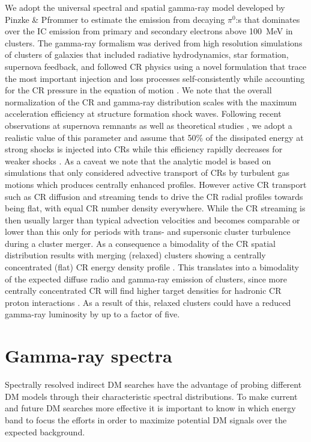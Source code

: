 \documentclass[10pt,aps,pra,reprint,amsmath,amsfonts,amssymb,showpacs,nofootinbib,floatfix]{revtex4-1}
\begin{document}
We adopt the universal spectral and spatial gamma-ray model developed
by Pinzke \& Pfrommer \cite{2010MNRAS.409..449P} to estimate the
emission from decaying $\pi^0$:s that dominates over the IC emission
from primary and secondary electrons above 100~MeV in clusters. The
gamma-ray formalism was derived from high resolution simulations of
clusters of galaxies that included radiative hydrodynamics, star
formation, supernova feedback, and followed CR physics using a novel
formulation that trace the most important injection and loss processes
self-consistently while accounting for the CR pressure in the
equation of motion
\cite{2008A&A...481...33J,2007A&A...473...41E,2006MNRAS.367..113P}.
We note that the overall normalization of the CR and gamma-ray
distribution scales with the maximum acceleration efficiency at
structure formation shock waves. Following recent observations at
supernova remnants \cite{2009Sci...325..719H} as well as theoretical
studies \cite{2005ApJ...620...44K}, we adopt a realistic value of this
parameter and assume that 50\% of the dissipated energy at strong
shocks is injected into CRs while this efficiency rapidly decreases
for weaker shocks \cite{2007A&A...473...41E}. As a caveat we note that
the analytic model is based on simulations that only considered
advective transport of CRs by turbulent gas motions which produces
centrally enhanced profiles. However active CR transport such as CR
diffusion and streaming tends to drive the CR radial profiles towards
being flat, with equal CR number density everywhere. While the CR
streaming is then usually larger than typical advection velocities and
becomes comparable or lower than this only for periods with trans- and
supersonic cluster turbulence during a cluster merger. As a
consequence a bimodality of the CR spatial distribution results with
merging (relaxed) clusters showing a centrally concentrated (flat) CR
energy density profile \cite{2011A&A...527A..99E}.  This translates
into a bimodality of the expected diffuse radio and gamma-ray emission
of clusters, since more centrally concentrated CR will find higher
target densities for hadronic CR proton interactions
\cite{2011A&A...527A..99E}. As a result of this, relaxed clusters
could have a reduced gamma-ray luminosity by up to a factor of five.
 

\section{Gamma-ray spectra}
\label{sect:spectral}
Spectrally resolved indirect DM searches have the advantage of probing
different DM models through their characteristic spectral
distributions. To make current and future DM searches more effective
it is important to know in which energy band to focus the efforts in
order to maximize potential DM signals over the expected background.
\end{document}
